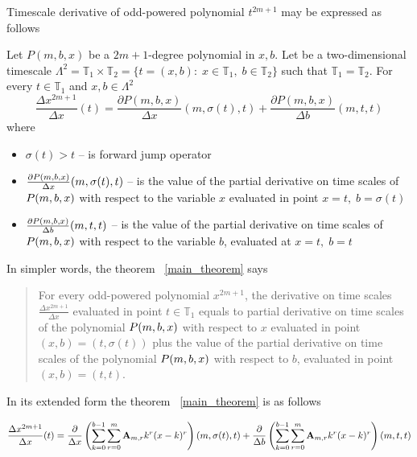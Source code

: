 Timescale derivative of odd-powered polynomial $t^{2m+1}$ may be expressed as follows
\begin{thm}
    \label{main_theorem}
    Let $P(m,b,x)$ be a $2m+1$-degree polynomial in $x,b$.
    Let be a two-dimensional timescale
    $\Lambda^2 = \mathbb{T}_1 \times \mathbb{T}_2 = \{t=(x, b) \colon \; x\in\mathbb{T}_1, \; b\in\mathbb{T}_2 \}$
    such that $\mathbb{T}_1 = \mathbb{T}_2$.
    For every $t\in\mathbb{T}_1$ and $x,b\in \Lambda^2$
    \[
        \frac{\Delta x^{2m+1}}{\Delta x}(t) =
        \frac{\partial P(m,b,x)}{\Delta x} (m, \sigma(t), t) +
        \frac{\partial P(m,b,x)}{\Delta b} (m, t, t)
    \]
    where
    \begin{itemize}
        \setlength\itemsep{1em}
        \item  $\sigma(t) > t$ -- is forward jump operator

        \item $\frac{\partial P ( m, b, x )}{\Delta x} (m, \sigma(t), t)$ --
        is the value of the partial derivative on time scales of
        $P ( m, b, x )$ with respect to the variable $x$ evaluated in point $x = t, \; b = \sigma(t)$

        \item $\frac{\partial P ( m, b, x )}{\Delta b} (m, t, t)$ --
        is the value of the partial derivative on time scales of
        $P ( m, b, x )$ with respect to the variable $b$, evaluated at $x = t, \; b = t$
    \end{itemize}
\end{thm}
In simpler words, the theorem ~\ref{main_theorem} says
\begin{center}
    \begin{quotation}
        For every odd-powered polynomial $x^{2m+1}$, the derivative on time scales $\frac{\Delta x^{2m+1}}{\Delta x}$
        evaluated in point $t\in\mathbb{T}_1$ equals to partial derivative on time scales of the polynomial
        $P ( m, b, x )$
        with respect to $x$
        evaluated in point
        $(x,b) = (t, \sigma(t))$
        plus the value of the partial derivative on time scales of the polynomial
        $P ( m, b, x )$
        with respect to $b$,
        evaluated in point
        $(x,b)=(t,t)$.
    \end{quotation}
\end{center}

In its extended form the theorem ~\ref{main_theorem} is as follows

\begin{align*}
    \frac{\Delta x^{2m+1}}{\Delta x}(t) =
    \frac{\partial}{\Delta x} \left( \sum_{k=0}^{b-1} \sum_{r=0}^{m} {\mathbf{A}} \sb{m,r} k^r(x-k)^r \right) (m, \sigma(t), t)
    + \frac{\partial}{\Delta b} \left( \sum_{k=0}^{b-1} \sum_{r=0}^{m} {\mathbf{A}} \sb{m,r} k^r(x-k)^r \right) (m, t, t)
\end{align*}
